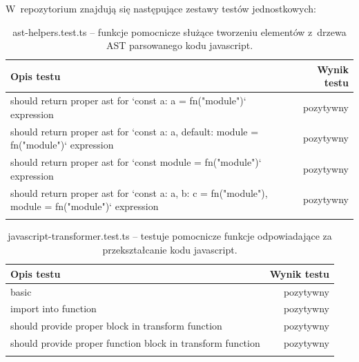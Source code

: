 \documentclass{SGGW-thesis}
\begin{document}
W~repozytorium znajdują się następujące zestawy testów jednostkowych:
\setlength\LTleft{0pt}
\setlength\LTright{0pt}
\begin{longtable}{@{\extracolsep{\fill}}|p{}|r|@{} }
    \hline
    \textbf{Opis testu}                                                                                                                                              & \textbf{Wynik testu} \\ \hline
    \endfirsthead
    \endhead
    should return proper ast for `const {a: a} = fn("module")` expression                                   & pozytywny            \\ \hline
    should return proper ast for `const {a: a, default: module} = fn("module")` expression                  & pozytywny            \\ \hline
    should return proper ast for `const module = fn("module")` expression                                   & pozytywny            \\ \hline
    should return proper ast for `const {a: a, b: c} = fn("module"), module = fn("module")` expression      & pozytywny            \\ \hline
    \caption{ast-helpers.test.ts -- funkcje pomocnicze służące tworzeniu elementów z~drzewa AST parsowanego kodu javascript.}
\end{longtable}

\begin{longtable}{@{\extracolsep{\fill}}|p{}|r|@{} }
    \hline
    \textbf{Opis testu}                                                                                                                                              & \textbf{Wynik testu} \\ \hline
    \endfirsthead
    \endhead
    basic                                                                                                                                                            & pozytywny            \\ \hline
    import into function                                                                                                                                             & pozytywny            \\ \hline
    should provide proper block in transform function                                                                                                                & pozytywny            \\ \hline
    should provide proper function block in transform function                                                                                                       & pozytywny            \\ \hline
    \caption{javascript-transformer.test.ts -- testuje pomocnicze funkcje odpowiadające za przekształcanie kodu javascript.}
\end{longtable}
\end{document}
